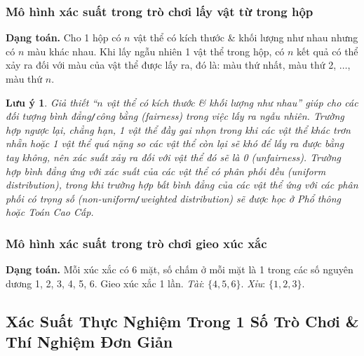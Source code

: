 \documentclass{article}
\numberwithin{equation}{section}
\newtheorem{remark}{Lưu ý}[section]
\begin{document}
\subsubsection{Mô hình xác suất trong trò chơi lấy vật từ trong hộp}
\textbf{Dạng toán.} Cho 1 hộp có $n$ vật thể có kích thước \& khối lượng như nhau nhưng có $n$ màu khác nhau. Khi lấy ngẫu nhiên 1 vật thể trong hộp, có $n$ kết quả có thể xảy ra đối với màu của vật thể được lấy ra, đó là: màu thứ nhất, màu thứ 2, $\ldots$, màu thứ $n$.

\begin{remark}
	Giả thiết ``$n$ vật thể có kích thước \& khối lượng như nhau'' giúp cho các đối tượng bình đẳng\emph{\texttt{/}}công bằng (fairness) trong việc lấy ra ngẫu nhiên. Trường hợp ngược lại, chẳng hạn, 1 vật thể đầy gai nhọn trong khi các vật thể khác trơn nhẵn hoặc 1 vật thể quá nặng so các vật thể còn lại sẽ khó để lấy ra được bằng tay không, nên xác suất xảy ra đối với vật thể đó sẽ là 0 (unfairness). Trường hợp bình đẳng ứng với xác suất của các vật thể có phân phối đều (uniform distribution), trong khi trường hợp bất bình đẳng của các vật thể ứng với các phân phối có trọng số (non-uniform\emph{\texttt{/}}weighted distribution) sẽ được học ở Phổ thông hoặc Toán Cao Cấp.
\end{remark}

\subsubsection{Mô hình xác suất trong trò chơi gieo xúc xắc}
\textbf{Dạng toán.} Mỗi xúc xắc có 6 mặt, số chấm ở mỗi mặt là 1 trong các số nguyên dương 1, 2, 3, 4, 5, 6. Gieo xúc xắc 1 lần. \textit{Tài}: $\{4,5,6\}$. \textit{Xỉu}: $\{1,2,3\}$.

\subsection{Xác Suất Thực Nghiệm Trong 1 Số Trò Chơi \& Thí Nghiệm Đơn Giản}
\end{document}
